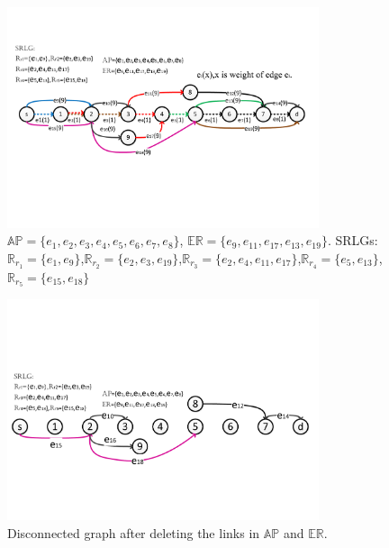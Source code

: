 
%
\begin{figure}[tp]
  \centering
  \includegraphics[width=3.6in]{franz/InitialGraph}
  \caption{$\mathbb{AP}=\{e_1,e_2,e_3,e_4,e_5,e_6,e_7,e_8\}$, $\mathbb{\mathbb{ER}}=\{e_9,e_{11},e_{17},e_{13},e_{19}\}$. SRLGs:$\mathbb{R}_{r_1}=\{e_1,e_9\}$,$\mathbb{R}_{r_2}=\{e_2,e_3,e_{19}\}$,$\mathbb{R}_{r_3}=\{e_2,e_4,e_{11},e_{17}\}$,$\mathbb{R}_{r_4}=\{e_5,e_{13}\}$,$\mathbb{R}_{r_5}=\{e_{15},e_{18}\}$}\label{fig:Initial Graph}
\end{figure}
\begin{figure}[tp]
  \centering
  \includegraphics[width=3.6in]{franz/DeletePathGraph}
  \caption{Disconnected graph after deleting the links in $\mathbb{AP}$ and ${\mathbb{ER}}$.}
  \label{fig:DeletePathGraph}
\end{figure}



